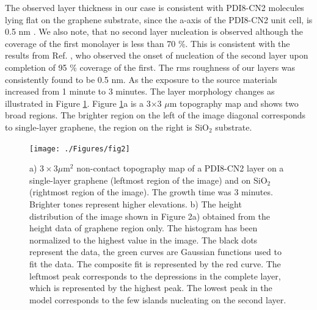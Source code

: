 \documentclass[preprint,aip,jap]{revtex4-2}
\begin{document}
The observed layer thickness in our case is consistent with PDI8-CN2 molecules lying flat on the graphene substrate, since the a-axis of the PDI8-CN2 unit cell, is 0.5 nm \cite{liscio-2012}. We also note, that no second layer nucleation is observed although the coverage of the first monolayer is less than 70 \%. This is consistent with the results from Ref. , who observed the onset of nucleation of the second layer upon completion of 95 \% coverage of the first. The rms roughness of our layers was consistently found to be 0.5 nm. As the exposure to the source materials increased from 1 minute to 3 minutes. The layer morphology changes as illustrated in Figure \ref{fig:2}. Figure \ref{fig:2}a is a  3$\times$3 $\mu$m topography map and shows two broad regions. The brighter region on the left of the image diagonal corresponds to single-layer graphene, the region on the right is SiO$_{2}$ substrate. 
\begin{figure}[htb]
  \centering
   \texttt{[image: ./Figures/fig2]}
  \caption{a) $3\times3 \mu$m$^{2}$ non-contact topography map of a PDI8-CN2 layer on a single-layer graphene (leftmost region of the image) and on SiO$_{2}$ (rightmost region of the image). The growth time was 3 minutes. Brighter tones represent higher elevations. b) The height distribution of the image shown in Figure 2a) obtained from the height data of graphene region only. The histogram has been normalized to the highest value in the image. The black dots represent the data, the green curves are Gaussian functions used to fit the data. The composite fit is represented by the red curve.  The leftmost peak corresponds to the depressions in the complete layer, which is represented by the highest peak. The lowest peak in the model corresponds to the few islands nucleating on the second layer.}
  \label{fig:2}
\end{figure}
\end{document}
